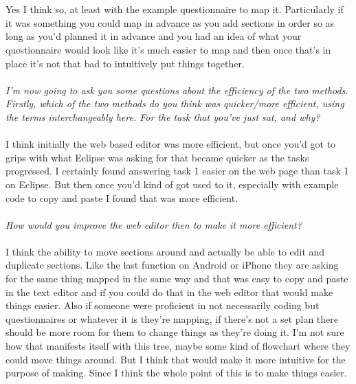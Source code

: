 \documentclass{report}
\begin{document}
\\
\\
Yes I think so, at least with the example questionnaire to map it. Particularly if it was something you could map in advance as you add sections in order so as long as you'd planned it in advance and you had an idea of what your questionnaire would look like it's much easier to map and then once that's in place it's not that bad to intuitively put things together.
\\
\\
\textit{I'm now going to ask you some questions about the efficiency of the two methods. Firstly, which of the two methods do you think was quicker/more efficient, using the terms interchangeably here. For the task that you've just sat, and why?}                                                                                                                                                                                                                                                                \\
\\
I think initially the web based editor was more efficient, but once you'd got to grips with what Eclipse was asking for that became quicker as the tasks progressed. I certainly found answering task 1 easier on the web page than task 1 on Eclipse. But then once you'd kind of got used to it, especially with example code to copy and paste I found that was more efficient.
\\
\\
\textit{How would you improve the web editor then to make it more efficient?}
\\
\\
I think the ability to move sections around and actually be able to edit and duplicate sections. Like the last function on Android or iPhone they are asking for the same thing mapped in the same way and that was easy to copy and paste in the text editor and if you could do that in the web editor that would make things easier. Also if someone were proficient in not necessarily coding but questionnaires or whatever it is they're mapping, if there's not a set plan there should be more room for them to change things as they're doing it. I'm not sure how that manifests itself with this tree, maybe some kind of flowchart where they could move things around. But I think that would make it more intuitive for the purpose of making. Since I think the whole point of this is to make things easier.
\\
\\
\end{document}
